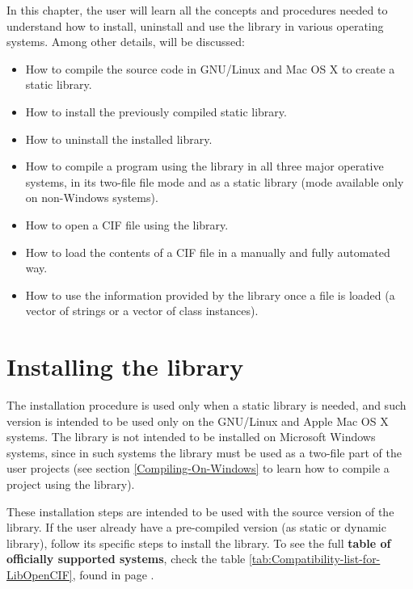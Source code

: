 \documentclass[11pt,twoside,openany,x11names,svgnames]{memoir}
\begin{document}
In this chapter, the user will learn all the concepts and procedures needed to understand how to install, uninstall and use the library in various operating systems. Among other details, will be discussed:

\begin{itemize}
	\item How to compile the source code in GNU/Linux and Mac OS X to create a static library.
	
	\item How to install the previously compiled static library.
	
	\item How to uninstall the installed library.
	
	\item How to compile a program using the library in all three major operative systems, in its two-file file mode and as a static library (mode available only on non-Windows systems).
	
	\item How to open a CIF file using the library.
	
	\item How to load the contents of a CIF file in a manually and fully automated way.
	
	\item How to use the information provided by the library once a file is loaded (a vector of strings or a vector of class instances).
\end{itemize}
\newpage 

\section{Installing the library}\label{Installing-The-Library}

The installation procedure is used only when a static library is needed, and such version is intended to be used only on the GNU/Linux and Apple Mac OS X systems. The library  is not intended to be installed on Microsoft Windows systems, since in such systems the library must be used as a two-file part of the user projects (see section \ref{Compiling-On-Windows} to learn how to compile a project using the library).

These installation steps are intended to be used with the source version of the library. If the user already have a pre-compiled version (as static or dynamic library), follow its specific steps to install the library. To see the full \textbf{table of officially supported systems}, check the table \ref{tab:Compatibility-list-for-LibOpenCIF}, found in page \pageref{tab:Compatibility-list-for-LibOpenCIF}.
\end{document}
